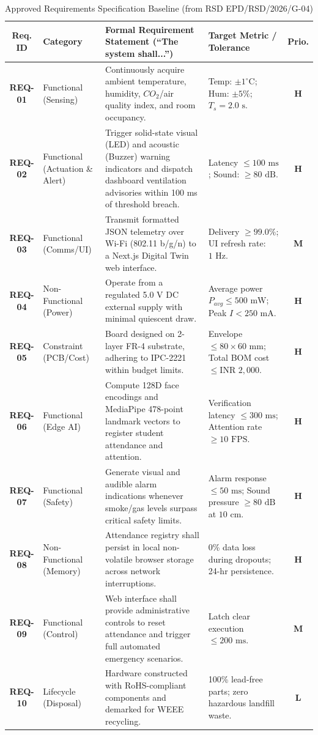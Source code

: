 \documentclass[11pt,a4paper]{article}
\begin{document}
\begin{table}[h!]
\centering
\caption{Approved Requirements Specification Baseline (from RSD EPD/RSD/2026/G-04)}
\begin{tabular}{|c|p{2.8cm}|p{6.8cm}|p{3.5cm}|c|}
\hline
\textbf{Req. ID} & \textbf{Category} & \textbf{Formal Requirement Statement (``The system shall...'')} & \textbf{Target Metric / Tolerance} & \textbf{Prio.} \\ \hline
\textbf{REQ-01} & Functional (Sensing) & Continuously acquire ambient temperature, humidity, $CO_2$/air quality index, and room occupancy. & Temp: $\pm 1^\circ\text{C}$; Hum: $\pm 5\%$; $T_s = 2.0\text{ s}$. & \textbf{H} \\ \hline
\textbf{REQ-02} & Functional (Actuation \& Alert) & Trigger solid-state visual (LED) and acoustic (Buzzer) warning indicators and dispatch dashboard ventilation advisories within 100 ms of threshold breach. & Latency $\le 100\text{ ms}$; Sound: $\ge 80\text{ dB}$. & \textbf{H} \\ \hline
\textbf{REQ-03} & Functional (Comms/UI) & Transmit formatted JSON telemetry over Wi-Fi (802.11 b/g/n) to a Next.js Digital Twin web interface. & Delivery $\ge 99.0\%$; UI refresh rate: $1\text{ Hz}$. & \textbf{M} \\ \hline
\textbf{REQ-04} & Non-Functional (Power) & Operate from a regulated 5.0 V DC external supply with minimal quiescent draw. & Average power $P_{avg} \le 500\text{ mW}$; Peak $I < 250\text{ mA}$. & \textbf{H} \\ \hline
\textbf{REQ-05} & Constraint (PCB/Cost) & Board designed on 2-layer FR-4 substrate, adhering to IPC-2221 within budget limits. & Envelope $\le 80 \times 60\text{ mm}$; Total BOM cost $\le \text{INR } 2,000$. & \textbf{H} \\ \hline
\textbf{REQ-06} & Functional (Edge AI) & Compute 128D face encodings and MediaPipe 478-point landmark vectors to register student attendance and attention. & Verification latency $\le 300\text{ ms}$; Attention rate $\ge 10\text{ FPS}$. & \textbf{H} \\ \hline
\textbf{REQ-07} & Functional (Safety) & Generate visual and audible alarm indications whenever smoke/gas levels surpass critical safety limits. & Alarm response $\le 50\text{ ms}$; Sound pressure $\ge 80\text{ dB}$ at $10\text{ cm}$. & \textbf{H} \\ \hline
\textbf{REQ-08} & Non-Functional (Memory) & Attendance registry shall persist in local non-volatile browser storage across network interruptions. & 0\% data loss during dropouts; 24-hr persistence. & \textbf{H} \\ \hline
\textbf{REQ-09} & Functional (Control) & Web interface shall provide administrative controls to reset attendance and trigger full automated emergency scenarios. & Latch clear execution $\le 200\text{ ms}$. & \textbf{M} \\ \hline
\textbf{REQ-10} & Lifecycle (Disposal) & Hardware constructed with RoHS-compliant components and demarked for WEEE recycling. & 100\% lead-free parts; zero hazardous landfill waste. & \textbf{L} \\ \hline
\end{tabular}
\end{table}
\end{document}
